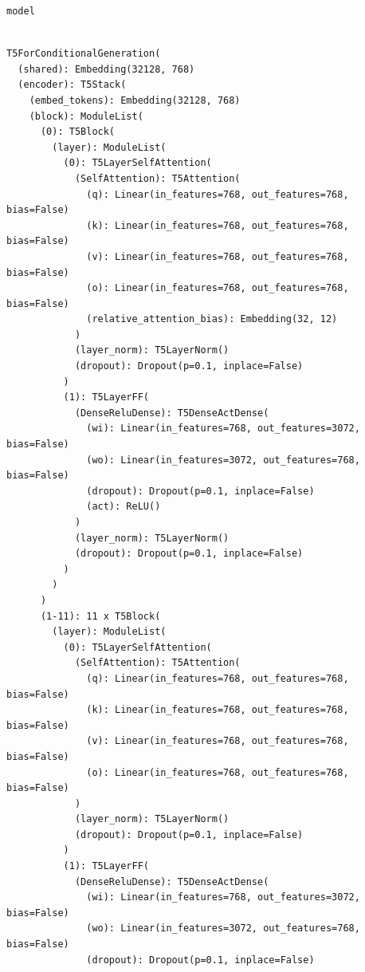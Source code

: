 \documentclass[../labs.tex]{subfiles}
\begin{document}
\begin{lstlisting}[language=Python,basicstyle=\ttfamily\scriptsize,breaklines=true,breakatwhitespace=false,columns=fullflexible,keepspaces=true,numbers=none]
model
\end{lstlisting}

\hypertarget{res:lab02-text-01-t5-ipynb-44-9372c470eead}{}

\begin{lstlisting}[basicstyle=\ttfamily\scriptsize,breaklines=true,breakatwhitespace=false,columns=fullflexible,keepspaces=true]

T5ForConditionalGeneration(
  (shared): Embedding(32128, 768)
  (encoder): T5Stack(
    (embed_tokens): Embedding(32128, 768)
    (block): ModuleList(
      (0): T5Block(
        (layer): ModuleList(
          (0): T5LayerSelfAttention(
            (SelfAttention): T5Attention(
              (q): Linear(in_features=768, out_features=768, bias=False)
              (k): Linear(in_features=768, out_features=768, bias=False)
              (v): Linear(in_features=768, out_features=768, bias=False)
              (o): Linear(in_features=768, out_features=768, bias=False)
              (relative_attention_bias): Embedding(32, 12)
            )
            (layer_norm): T5LayerNorm()
            (dropout): Dropout(p=0.1, inplace=False)
          )
          (1): T5LayerFF(
            (DenseReluDense): T5DenseActDense(
              (wi): Linear(in_features=768, out_features=3072, bias=False)
              (wo): Linear(in_features=3072, out_features=768, bias=False)
              (dropout): Dropout(p=0.1, inplace=False)
              (act): ReLU()
            )
            (layer_norm): T5LayerNorm()
            (dropout): Dropout(p=0.1, inplace=False)
          )
        )
      )
      (1-11): 11 x T5Block(
        (layer): ModuleList(
          (0): T5LayerSelfAttention(
            (SelfAttention): T5Attention(
              (q): Linear(in_features=768, out_features=768, bias=False)
              (k): Linear(in_features=768, out_features=768, bias=False)
              (v): Linear(in_features=768, out_features=768, bias=False)
              (o): Linear(in_features=768, out_features=768, bias=False)
            )
            (layer_norm): T5LayerNorm()
            (dropout): Dropout(p=0.1, inplace=False)
          )
          (1): T5LayerFF(
            (DenseReluDense): T5DenseActDense(
              (wi): Linear(in_features=768, out_features=3072, bias=False)
              (wo): Linear(in_features=3072, out_features=768, bias=False)
              (dropout): Dropout(p=0.1, inplace=False)

\end{lstlisting}
\end{document}
